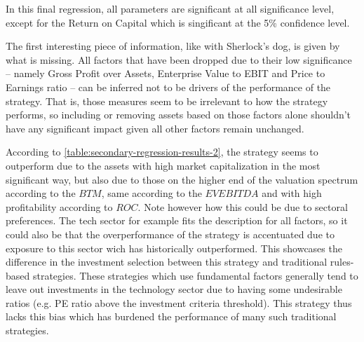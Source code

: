 In this final regression, all parameters are significant at all significance level, except for the Return on Capital which is singificant at the 5\% confidence level. 

The first interesting piece of information, like with Sherlock's dog, is given by what is missing. All factors that have been dropped due to their low significance -- namely Gross Profit over Assets, Enterprise Value to EBIT and Price to Earnings ratio -- can be inferred not to be drivers of the performance of the strategy. That is, those measures seem to be irrelevant to how the strategy performs, so including or removing assets based on those factors alone shouldn't have any significant impact given all other factors remain unchanged. 

According to \autoref{table:secondary-regression-results-2}, the strategy seems to outperform due to the assets with high market capitalization in the most significant way, but also due to those on the higher end of the valuation spectrum according to the $BTM$, same according to the $EVEBITDA$ and  with high profitability according to $ROC$. Note however how this could be due to sectoral preferences. The tech sector for example fits the description for all factors, so it could also be that the overperformance of the strategy is accentuated due to exposure to this sector wich has historically outperformed. This showcases the difference in the investment selection between this strategy and traditional rules-based strategies. These strategies which use fundamental factors generally tend to leave out investments in the technology sector due to having some undesirable ratios (e.g. PE ratio above the investment criteria threshold). This strategy thus lacks this bias which has burdened the performance of many such traditional strategies.